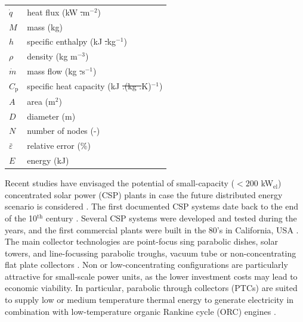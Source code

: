 \documentclass[final,3p,times,review]{elsarticle}
\providecommand{\DIFadd}[1]{{\protect\color{blue}\uwave{#1}}} %
\providecommand{\DIFdel}[1]{{\protect\color{red}\sout{#1}}}                      %
\providecommand{\DIFaddFL}[1]{\DIFadd{#1}} %
\providecommand{\DIFdelFL}[1]{\DIFdel{#1}} %
\providecommand{\DIFaddbeginFL}{} %
\providecommand{\DIFaddendFL}{} %
\providecommand{\DIFdelbeginFL}{} %
\providecommand{\DIFdelendFL}{} %
\begin{document}
\begin{table}[h!]
\begin{tabular}{lp{7.5cm}}
$\dot{q}$& heat flux (kW \DIFdelbeginFL \DIFdelFL{.}\DIFdelendFL m$^{-2}$) \\
$M$ & mass (kg)\\
$h$ & specific enthalpy (kJ \DIFdelbeginFL \DIFdelFL{.}\DIFdelendFL kg$^{-1}$)\\
$\rho$ & density (kg m$^{-3}$)\\
$\dot{m}$& mass flow (kg \DIFdelbeginFL \DIFdelFL{.}\DIFdelendFL s$^{-1}$) \\
$ C_\mathrm{p} $& specific heat capacity (kJ \DIFdelbeginFL \DIFdelFL{.(kg .}\DIFdelendFL \DIFaddbeginFL \DIFaddFL{(kg }\DIFaddendFL K)$^{-1}$) \\
$A$ & area (m$^{2}$)\\
$D$ & diameter (m)\\
$N$ & number of nodes (-)\\
$\bar{\varepsilon}$ & relative error (\%)\\
$E$ & energy  (kJ)\\
\end{tabular}
\end{table}
%
Recent studies have envisaged the potential of small-capacity ($<200$ kW$_\mathrm{el}$) concentrated solar power (CSP) plants in case the future distributed energy scenario is considered \cite{Casati2012a,Prabhu2006}. The first documented CSP systems date back to the end of the 10$^\mathrm{th}$ century \cite{Butti_1980}. Several CSP systems were developed and tested during the years, and the first commercial plants were built in the 80's in California, USA \cite{IRENA_CSP_2013}.  The main collector technologies are point-focus sing parabolic dishes, solar towers, and line-focussing parabolic troughs, vacuum tube or non-concentrating flat plate collectors \cite{Winter1991}. Non or low-concentrating configurations are particularly attractive for small-scale power units, as the lower investment costs may lead to economic viability. In particular,  parabolic through collectors (PTCs) are suited to supply low or medium temperature thermal energy to generate electricity in combination with low-temperature organic Rankine cycle (ORC) engines \cite{Verneau1978,Angelino1984Areview}.\\
\end{document}
